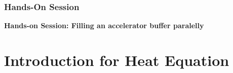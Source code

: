 \documentclass[9pt]{beamer}
\begin{document}




\begin{frame}
\frametitle{Hands-On Session}
\begin{center}
      \Huge \textbf{Hands-on Session: Filling an accelerator buffer paralelly}
  \end{center}
\end{frame}

\section{Introduction for Heat Equation} %
\end{document}
